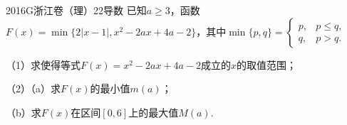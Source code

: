
\begin{problem}{2016}{G}{浙江卷（理）}{22}{导数}
已知$a\geq3$，函数$F(x)=\min\{2|x-1|,x^2-2ax+4a-2\}$，其中$\min\{p,q\}=\begin{cases}p, & p\leq q, \\ q, & p>q.\end{cases}$

（1）求使得等式$F(x)=x^2-2ax+4a-2$成立的$x$的取值范围；

（2）（a）求$F(x)$的最小值$m(a)$；

（b）求$F(x)$在区间$[0,6]$上的最大值$M(a)$.
\end{problem}